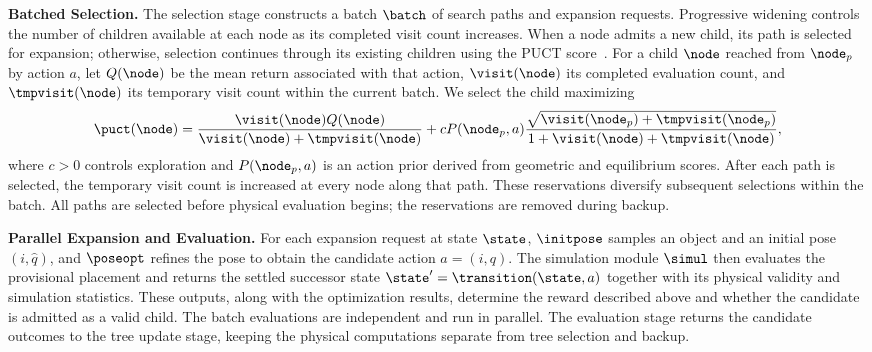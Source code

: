 \noindent \textbf{Batched Selection.}
The selection stage constructs a batch $\batch$ of search paths and
expansion requests. Progressive widening controls the number of children
available at each node as its completed visit count increases. When a node
admits a new child, its path is selected for expansion; otherwise, selection
continues through its existing children using the PUCT
score~\cite{silver2017mastering}.
For a child $\node$ reached from $\node_p$ by action $a$, let $Q(\node)$ be
the mean return associated with that action, $\visit(\node)$ its completed
evaluation count, and $\tmpvisit(\node)$ its temporary visit count within
the current batch. We select the child maximizing
\begin{equation}
    \puct(\node) =
    \frac{\visit(\node)Q(\node)}{\visit(\node)+\tmpvisit(\node)}
    + cP(\node_p,a)
    \frac{\sqrt{\visit(\node_p)+\tmpvisit(\node_p)}}
         {1+\visit(\node)+\tmpvisit(\node)},
    \label{eq:puct}
\end{equation}
where $c>0$ controls exploration and $P(\node_p,a)$ is an action prior
derived from geometric and equilibrium scores.
After each path is selected, the temporary visit count is increased at every
node along that path. These reservations diversify subsequent selections
within the batch. All paths are selected before physical evaluation begins;
the reservations are removed during backup.

\noindent \textbf{Parallel Expansion and Evaluation.}
For each expansion request at state $\state$, $\initpose$ samples an object
and an initial pose $(i,\hat q)$, and $\poseopt$ refines the pose to obtain
the candidate action $a=(i,q)$. The simulation module $\simul$ then evaluates
the provisional placement and returns the settled successor state
$\state'=\transition(\state,a)$ together with its physical validity and
simulation statistics. These outputs, along with the optimization results,
determine the reward described above and whether the candidate is admitted
as a valid child. The batch evaluations are independent and run in parallel.
The evaluation stage returns the candidate outcomes to the tree update stage,
keeping the physical computations separate from tree selection and backup.

